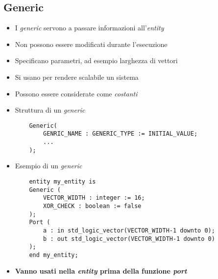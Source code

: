 \documentclass{article}
\begin{document}
\subsection{Generic}
\begin{itemize}
	\item I \textit{generic} servono a passare informazioni all'\textit{entity}
	\item Non possono essere modificati durante l'esecuzione
	\item Specificano parametri, ad esempio larghezza di vettori
	\item Si usano per rendere scalabile un sistema
	\item Possono essere considerate come \textit{costanti}
	\item Struttura di un \textit{generic}
	      \begin{verbatim}
    Generic(
        GENRIC_NAME : GENERIC_TYPE := INITIAL_VALUE;
        ...
    );
	      \end{verbatim}
	\item Esempio di un \textit{generic}
	      \begin{verbatim}
    entity my_entity is
    Generic (
        VECTOR_WIDTH : integer := 16;
        XOR_CHECK : boolean := false
    );
    Port (
        a : in std_logic_vector(VECTOR_WIDTH-1 downto 0);
        b : out std_logic_vector(VECTOR_WIDTH-1 downto 0)
    );
    end my_entity;
	      \end{verbatim}
	\item \textbf{Vanno usati nella \textit{entity} prima della funzione \textit{port}}
\end{itemize}
\end{document}

